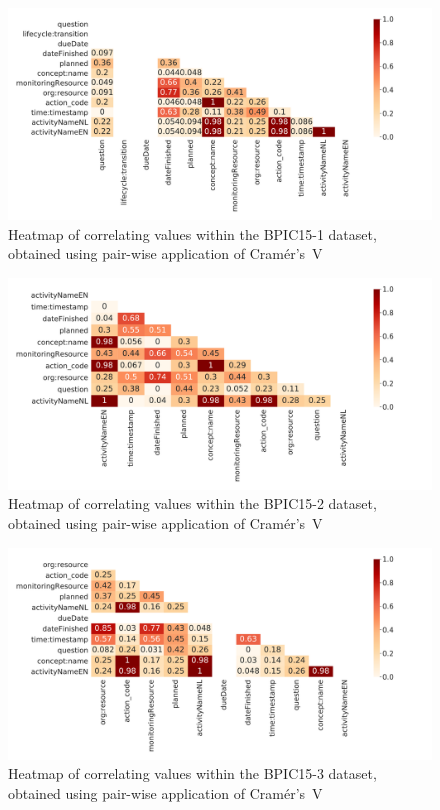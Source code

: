 \begin{figure}[ht!]
\centering
\includegraphics[width=\textwidth]{gfx/bpic2015_1/correlation-heatmap.pdf}
\caption[Cramér's V heatmap of BPIC15-1]{Heatmap of correlating values within the BPIC15-1 dataset, obtained using pair-wise application of Cramér's~V}
\label{fig:BPIC15-1-correlation-heatmap}
\end{figure}

\begin{figure}[ht!]
\centering
\includegraphics[width=\textwidth]{gfx/bpic2015_2/correlation-heatmap.pdf}
\caption[Cramér's V heatmap of BPIC15-2]{Heatmap of correlating values within the BPIC15-2 dataset, obtained using pair-wise application of Cramér's~V}
\label{fig:BPIC15-2-correlation-heatmap}
\end{figure}

\begin{figure}[ht!]
\centering
\includegraphics[width=\textwidth]{gfx/bpic2015_3/correlation-heatmap.pdf}
\caption[Cramér's V heatmap of BPIC15-3]{Heatmap of correlating values within the BPIC15-3 dataset, obtained using pair-wise application of Cramér's~V}
\label{fig:BPIC15-3-correlation-heatmap}
\end{figure}

